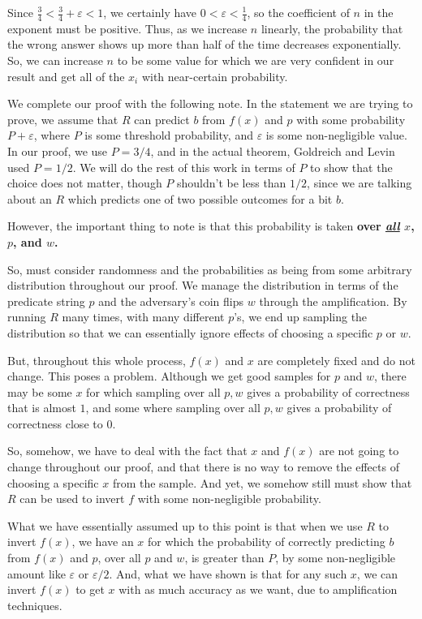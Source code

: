 \documentclass[11pt]{article}
\begin{document}
Since \(\frac{3}{4}<\frac{3}{4}+\varepsilon<1\), we certainly have \(0<\varepsilon<\frac{1}{4}\), so the coefficient of \(n\) in the exponent must be positive. Thus, as we increase \(n\) linearly, the probability that the wrong answer shows up more than half of the time decreases exponentially. So, we can increase \(n\) to be some value for which we are very confident in our result and get all of the \(x_i\) with near-certain probability.

\newpage
We complete our proof with the following note. In the statement we are trying to prove, we assume that \(R\) can predict \(b\) from \(f(x)\) and \(p\) with some probability \(P+\varepsilon\), where \(P\) is some threshold probability, and \(\varepsilon\) is some non-negligible value. In our proof, we use \(P=3/4\), and in the actual theorem, Goldreich and Levin used \(P=1/2\). We will do the rest of this work in terms of \(P\) to show that the choice does not matter, though \(P\) shouldn't be less than \(1/2\), since we are talking about an \(R\) which predicts one of two possible outcomes for a bit \(b\). 

However, the important thing to note is that this probability is taken \textbf{over \underline{\emph{all}} \(x\), \(p\), and \(w\).}\medskip

So, must consider randomness and the probabilities as being from some arbitrary distribution throughout our proof. We manage the distribution in terms of the predicate string \(p\) and the adversary's coin flips \(w\) through the amplification. By running \(R\) many times, with many different \(p\)'s, we end up sampling the distribution so that we can essentially ignore effects of choosing a specific \(p\) or \(w\). \smallskip

But, throughout this whole process, \(f(x)\) and \(x\) are completely fixed and do not change. This poses a problem. Although we get good samples for \(p\) and \(w\), there may be some \(x\) for which sampling over all \(p,w\) gives a probability of correctness that is almost \(1\), and some where sampling over all \(p,w\) gives a probability of correctness close to \(0\).\smallskip

So, somehow, we have to deal with the fact that \(x\) and \(f(x)\) are not going to change throughout our proof, and that there is no way to remove the effects of choosing a specific \(x\) from the sample. And yet, we somehow still must show that \(R\) can be used to invert \(f\) with some non-negligible probability.\medskip

What we have essentially assumed up to this point is that when we use \(R\) to invert \(f(x)\), we have an \(x\) for which the probability of correctly predicting \(b\) from \(f(x)\) and \(p\), over all \(p\) and \(w\), is greater than \(P\), by some non-negligible amount like \(\varepsilon\) or \(\varepsilon/2\). And, what we have shown is that for any such \(x\), we can invert \(f(x)\) to get \(x\) with as much accuracy as we want, due to amplification techniques.\smallskip
\end{document}
